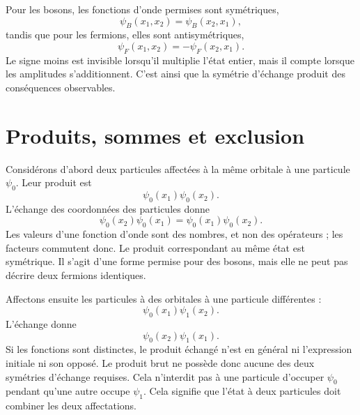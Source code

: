 
Pour les bosons, les fonctions d’onde permises sont symétriques,
\begin{equation}
\psi_B(x_1,x_2)=\psi_B(x_2,x_1),
\end{equation}
tandis que pour les fermions, elles sont antisymétriques,
\begin{equation}
\psi_F(x_1,x_2)=-\psi_F(x_2,x_1).
\end{equation}
Le signe moins est invisible lorsqu’il multiplie l’état entier, mais il compte lorsque les amplitudes s’additionnent. C’est ainsi que la symétrie d’échange produit des conséquences observables.

\section{Produits, sommes et exclusion}

Considérons d’abord deux particules affectées à la même orbitale à une particule \(\psi_0\). Leur produit est
\begin{equation}
\psi_0(x_1)\psi_0(x_2).
\end{equation}
L’échange des coordonnées des particules donne
\begin{equation}
\psi_0(x_2)\psi_0(x_1)
=
\psi_0(x_1)\psi_0(x_2).
\end{equation}
Les valeurs d’une fonction d’onde sont des nombres, et non des opérateurs ; les facteurs commutent donc. Le produit correspondant au même état est symétrique. Il s’agit d’une forme permise pour des bosons, mais elle ne peut pas décrire deux fermions identiques.

Affectons ensuite les particules à des orbitales à une particule différentes :
\begin{equation}
\psi_0(x_1)\psi_1(x_2).
\end{equation}
L’échange donne
\begin{equation}
\psi_0(x_2)\psi_1(x_1).
\end{equation}
Si les fonctions sont distinctes, le produit échangé n’est en général ni l’expression initiale ni son opposé. Le produit brut ne possède donc aucune des deux symétries d’échange requises. Cela n’interdit pas à une particule d’occuper \(\psi_0\) pendant qu’une autre occupe \(\psi_1\). Cela signifie que l’état à deux particules doit combiner les deux affectations.

